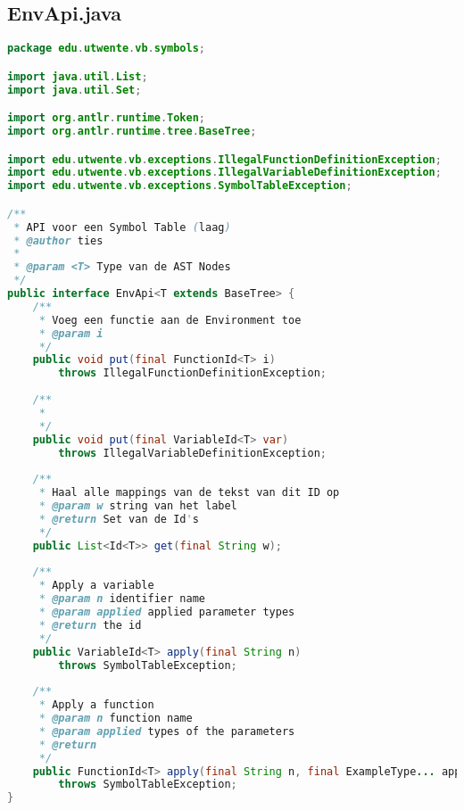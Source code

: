 \subsection{EnvApi.java}
\begin{lstlisting}[language=Java]
package edu.utwente.vb.symbols;

import java.util.List;
import java.util.Set;

import org.antlr.runtime.Token;
import org.antlr.runtime.tree.BaseTree;

import edu.utwente.vb.exceptions.IllegalFunctionDefinitionException;
import edu.utwente.vb.exceptions.IllegalVariableDefinitionException;
import edu.utwente.vb.exceptions.SymbolTableException;

/**
 * API voor een Symbol Table (laag)
 * @author ties
 *
 * @param <T> Type van de AST Nodes
 */
public interface EnvApi<T extends BaseTree> {
	/**
	 * Voeg een functie aan de Environment toe
	 * @param i
	 */
	public void put(final FunctionId<T> i) 
        throws IllegalFunctionDefinitionException;
	
	/**
	 * 
	 */
	public void put(final VariableId<T> var) 
        throws IllegalVariableDefinitionException;
	
	/**
	 * Haal alle mappings van de tekst van dit ID op
	 * @param w string van het label
	 * @return Set van de Id's
	 */
	public List<Id<T>> get(final String w);
	
	/**
	 * Apply a variable
	 * @param n identifier name
	 * @param applied applied parameter types
	 * @return the id
	 */
	public VariableId<T> apply(final String n) 
        throws SymbolTableException;
	
	/**
	 * Apply a function
	 * @param n function name
	 * @param applied types of the parameters
	 * @return
	 */
	public FunctionId<T> apply(final String n, final ExampleType... applied) 
        throws SymbolTableException;
}
\end{lstlisting}
